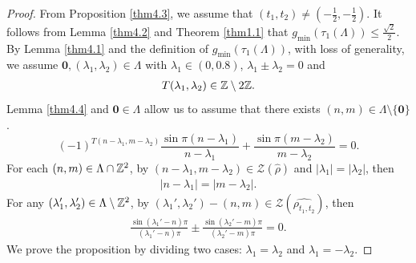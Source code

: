 \documentclass[10pt,a4paper]{amsart}
\begin{document}
\begin{proof}
	From Proposition \ref{thm4.3}, we assume that $(t_1,t_2)\neq(-\frac12,-\frac12)$.
It follows from Lemma \ref{thm4.2} and Theorem \ref{thm1.1} that 
$g_{\min}(\tau_1(\Lambda))\leq \frac{\sqrt{2}}{2}$. 
By Lemma \ref{thm4.1} and the definition of $g_{\min}(\tau_1(\Lambda))$, with loss of generality, we assume $\mathbf{0},(\lambda_1,\lambda_2)\in\Lambda$ with $\lambda_1\in(0,0.8)$,  $\lambda_1\pm\lambda_2=0$ and 
\begin{align}\label{(4.3)}
	T(\lambda_1,\lambda_2)\in\Bbb Z\setminus2\Bbb Z.
\end{align} 
Lemma \ref{thm4.4} and $\mathbf{0}\in\Lambda$ allow us to assume that there exists $(n,m)\in\Lambda\setminus\{\mathbf{0}\}$. 
$$
	(-1)^{T(n-\lambda_1,m-\lambda_2)}\frac{\sin\pi(n-\lambda_1)}{n-\lambda_1}+	\frac{\sin\pi(m-\lambda_2)}{m-\lambda_2}=0.
$$
For each $(n,m)\in\Lambda\cap\Bbb Z^2$, by $(n-\lambda_1,m-\lambda_2)\in\mathcal{Z}(\widehat{\rho})$ and $|\lambda_1|=|\lambda_2|$, then 
\begin{align}\label{(4.4)}
|n-\lambda_1|=|m-\lambda_2|.
\end{align}
For any $(\lambda_1',\lambda_2')\in\Lambda\setminus\Bbb Z^2$, by $(\lambda_1',\lambda_2')-(n,m)\in\mathcal{Z}(\widehat{\rho_{t_1,t_2}})$, then 
\begin{align}\label{(4.5)}
\frac{\sin(\lambda_1'-n)\pi}{(\lambda_1'-n)\pi}\pm \frac{\sin(\lambda_2'-m)\pi}{(\lambda_2'-m)\pi}=0.
\end{align}
We prove the proposition by dividing two cases: $\lambda_1=\lambda_2$ and $\lambda_1=-\lambda_2$.


\end{proof}
\end{document}
